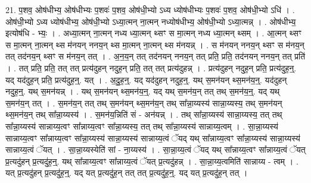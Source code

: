 \documentclass[17pt]{extarticle}
\begin{document}
21. प॒शव॒ ओष॑धीभ्य॒ ओष॑धीभ्यः प॒शवः॑ प॒शव॒ ओष॑धी॒भ्यो ऽध्य ध्योष॑धीभ्यः प॒शवः॑ प॒शव॒ ओष॑धी॒भ्यो ऽधि॑ । . ओष॑धी॒भ्यो ऽध्य ध्योष॑धीभ्य॒ ओष॑धी॒भ्यो ऽध्या॒त्मन् ना॒त्मन् नध्योष॑धीभ्य॒ ओष॑धी॒भ्यो ऽध्या॒त्मन्न् । . ओष॑धीभ्य॒ इत्योष॑धि - भ्यः॒ । . अध्या॒त्मन् ना॒त्मन् नध्य ध्या॒त्मन् थ्सꣳ स मा॒त्मन् नध्य ध्या॒त्मन् थ्सम् । . आ॒त्मन् थ्सꣳ स मा॒त्मन् ना॒त्मन् थ्स म॑नयन् ननय॒न् थ्स मा॒त्मन् ना॒त्मन् थ्स म॑नयन्न् । . स म॑नयन् ननय॒न् थ्सꣳ स म॑नय॒न् तत् तद॑नय॒न् थ्सꣳ स म॑नय॒न् तत् । . अ॒न॒य॒न् तत् तद॑नयन् ननय॒न् तत् प्रति॒ प्रति॒ तद॑नयन् ननय॒न् तत् प्रति॑ । . तत् प्रति॒ प्रति॒ तत् तत् प्रत्य॑दुहन् नदुह॒न् प्रति॒ तत् तत् प्रत्य॑दुहन्न् । . प्रत्य॑दुहन् नदुह॒न् प्रति॒ प्रत्य॑दुह॒न्॒. यद् यद॑दुह॒न् प्रति॒ प्रत्य॑दुह॒न्॒. यत् । . अ॒दु॒ह॒न्॒. यद् यद॑दुहन् नदुह॒न्॒. यथ् स॒मन॑यन् थ्स॒मन॑य॒न्॒. यद॑दुहन् नदुह॒न्॒. यथ् स॒मन॑यन्न् । . यथ् स॒मन॑यन् थ्स॒मन॑य॒न्॒. यद् यथ् स॒मन॑य॒न् तत् तथ् स॒मन॑य॒न्॒. यद् यथ् स॒मन॑य॒न् तत् । . स॒मन॑य॒न् तत् तथ् स॒मन॑यन् थ्स॒मन॑य॒न् तथ् सा᳚न्ना॒य्यस्य॑ सान्ना॒य्यस्य॒ तथ् स॒मन॑यन् थ्स॒मन॑य॒न् तथ् सा᳚न्ना॒य्यस्य॑ । . स॒मन॑य॒न्निति॑ सं - अन॑यन्न् । . तथ् सा᳚न्ना॒य्यस्य॑ सान्ना॒य्यस्य॒ तत् तथ् सा᳚न्ना॒य्यस्य॑ सान्नाय्य॒त्वꣳ सा᳚न्नाय्य॒त्वꣳ सा᳚न्ना॒य्यस्य॒ तत् तथ् सा᳚न्ना॒य्यस्य॑ सान्नाय्य॒त्वम् । . सा॒न्ना॒य्यस्य॑ सान्नाय्य॒त्वꣳ सा᳚न्नाय्य॒त्वꣳ सा᳚न्ना॒य्यस्य॑ सान्ना॒य्यस्य॑ सान्नाय्य॒त्वं ॅयद् यथ् सा᳚न्नाय्य॒त्वꣳ सा᳚न्ना॒य्यस्य॑ सान्ना॒य्यस्य॑ सान्नाय्य॒त्वं ॅयत् । . सा॒न्ना॒य्यस्येति॑ सां - ना॒य्यस्य॑ । . सा॒न्ना॒य्य॒त्वं ॅयद् यथ् सा᳚न्नाय्य॒त्वꣳ सा᳚न्नाय्य॒त्वं ॅयत् प्र॒त्यदु॑हन् प्र॒त्यदु॑ह॒न्॒. यथ् सा᳚न्नाय्य॒त्वꣳ सा᳚न्नाय्य॒त्वं ॅयत् प्र॒त्यदु॑हन्न् । . सा॒न्ना॒य्य॒त्वमिति॑ सान्नाय्य - त्वम् । . यत् प्र॒त्यदु॑हन् प्र॒त्यदु॑ह॒न्॒. यद् यत् प्र॒त्यदु॑ह॒न् तत् तत् प्र॒त्यदु॑ह॒न्॒. यद् यत् प्र॒त्यदु॑ह॒न् तत् । \newline
\end{document}
